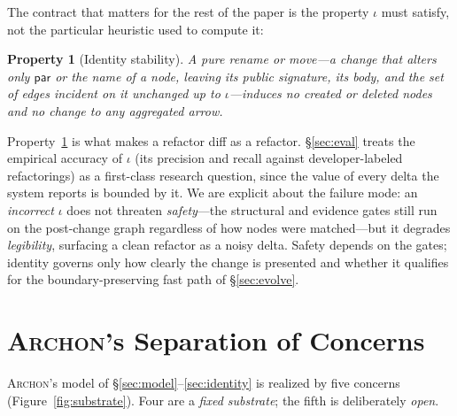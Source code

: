 \documentclass[sigconf,review,anonymous]{acmart}
\theoremstyle{plain}
\newtheorem{property}[theorem]{Property}
\theoremstyle{definition}
\begin{document}
The contract that matters for the rest of the paper is the property $\iota$
must satisfy, not the particular heuristic used to compute it:

\begin{property}[Identity stability]\label{prop:identity}
A pure rename or move---a change that alters only $\mathsf{par}$ or the name of
a node, leaving its public signature, its body, and the set of edges incident
on it unchanged up to $\iota$---induces \emph{no} created or deleted nodes and
\emph{no} change to any aggregated arrow.
\end{property}

\noindent
Property~\ref{prop:identity} is what makes a refactor diff as a refactor.
\S\ref{sec:eval} treats the empirical accuracy of $\iota$ (its precision and
recall against developer-labeled refactorings) as a first-class research
question, since the value of every delta the system reports is bounded by it.
We are explicit about the failure mode: an \emph{incorrect} $\iota$ does not
threaten \emph{safety}---the structural and evidence gates still run on the
post-change graph regardless of how nodes were matched---but it degrades
\emph{legibility}, surfacing a clean refactor as a noisy delta. Safety depends
on the gates; identity governs only how clearly the change is presented and
whether it qualifies for the boundary-preserving fast path of
\S\ref{sec:evolve}.

\section{\textsc{Archon}'s Separation of Concerns}\label{sec:concerns}

\textsc{Archon}'s model of \S\ref{sec:model}--\ref{sec:identity} is realized by five
concerns (Figure~\ref{fig:substrate}). Four are a \emph{fixed substrate}; the
fifth is deliberately \emph{open}.
\end{document}
